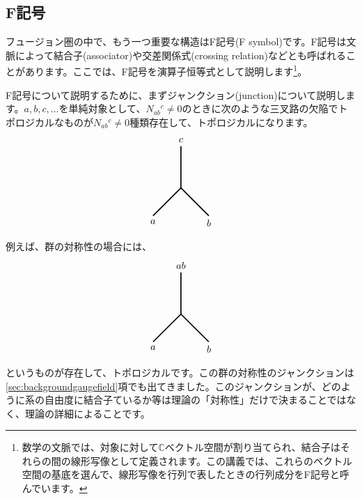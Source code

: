 \documentclass[report,paper=a4, fontsize=12pt, line_length=16cm, number_of_lines=33,dvipdfmx]{jlreq}
\numberwithin{equation}{chapter}
\newcommand{\Cb}{\mathbb{C}}
\begin{document}
\subsection{F記号}
フュージョン圏の中で、もう一つ重要な構造はF記号(F symbol)です。F記号は文脈によって結合子(associator)や交差関係式(crossing relation)などとも呼ばれることがあります。ここでは、F記号を演算子恒等式として説明します\footnote{数学の文脈では、対象に対して$\Cb$ベクトル空間が割り当てられ、結合子はそれらの間の線形写像として定義されます。この講義では、これらのベクトル空間の基底を選んで、線形写像を行列で表したときの行列成分をF記号と呼んでいます。}。

F記号について説明するために、まずジャンクション(junction)について説明します。$a,b,c,\dots$を単純対象として、$N_{ab}{}^{c}\ne 0$のときに次のような三叉路の欠陥でトポロジカルなものが$N_{ab}{}^{c}\ne 0$種類存在して、トポロジカルになります。
\begin{align}
  \begin{tikzpicture}
    \draw[very thick](0,0)--(0,1.5) node[above]{$c$};
    \draw[very thick](0,0)--(-1,-1) node[below]{$a$};
    \draw[very thick](0,0)--(1,-1) node[below]{$b$};
  \end{tikzpicture}    
\end{align}
例えば、群の対称性の場合には、
\begin{align}
  \begin{tikzpicture}
    \draw[very thick](0,0)--(0,1.5) node[above]{$ab$};
    \draw[very thick](0,0)--(-1,-1) node[below]{$a$};
    \draw[very thick](0,0)--(1,-1) node[below]{$b$};
  \end{tikzpicture}    
\end{align}
というものが存在して、トポロジカルです。この群の対称性のジャンクションは\ref{sec:backgroundgaugefield}項でも出てきました。このジャンクションが、どのように系の自由度に結合子ているか等は理論の「対称性」だけで決まることではなく、理論の詳細によることです。
\end{document}
